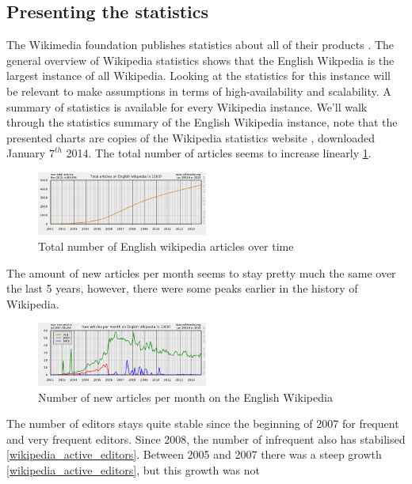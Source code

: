 \documentclass[12pt]{report}
\begin{document}
\subsection{Presenting the statistics}
The Wikimedia foundation publishes statistics about all of their
products \cite{stats_wikimedia}. The general overview of Wikipedia
statistics \cite{stats_wikipedia} shows that the English Wikpedia is
the largest instance of all Wikipedia. Looking at the statistics for
this instance will be relevant to make assumptions in terms of
high-availability and scalability.
A summary of statistics is available for every Wikipedia instance.
We'll walk through the statistics summary of the English Wikipedia
instance, note that the presented charts are copies of the Wikipedia
statistics website \cite{stats_wikipedia}, downloaded January $7^{th}$
2014.
The total number of articles seems to increase linearly \ref{wikipedia_nr_articles_over_time}.
\begin{figure}[h!]
  \caption{Total number of English wikipedia articles over time}
  \label{wikipedia_nr_articles_over_time}
  \centering
    \includegraphics[width=0.5\textwidth]{pics/wikipedia_nr_articles_over_time.png}
\end{figure}
The amount of new articles per month seems to stay pretty much the
same over the last 5 years, however, there were some peaks earlier in
the history of Wikipedia.
\begin{figure}[h!]
  \caption{Number of new articles per month on the English Wikipedia}
  \label{wikipedia_new_articles_per_month}
  \centering
    \includegraphics[width=0.5\textwidth]{pics/wikipedia_new_articles_per_month.png}
\end{figure}
The number of editors stays quite stable since the beginning of 2007
for frequent and very frequent editors. Since 2008, the number of
infrequent also has stabilised \ref{wikipedia_active_editors}. Between 2005 and 2007 there was a
steep growth \ref{wikipedia_active_editors}, but this growth was not
\end{document}
